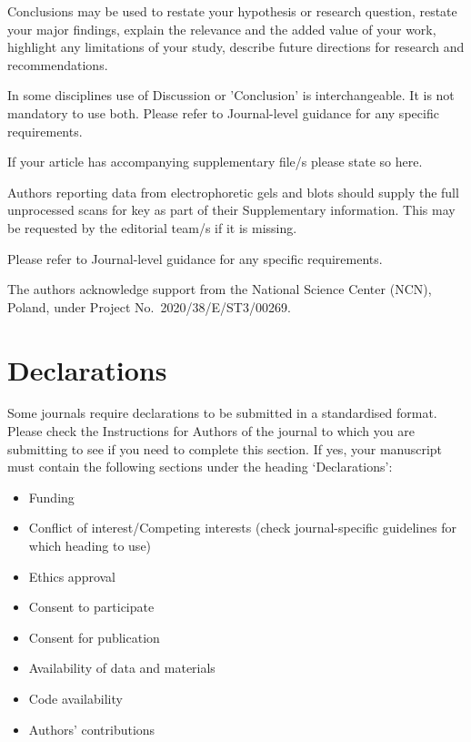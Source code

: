 \documentclass[default,iicol]{sn-jnl}%
\theoremstyle{thmstyleone}%
\theoremstyle{thmstyletwo}%
\theoremstyle{thmstylethree}%
\begin{document}
Conclusions may be used to restate your hypothesis or research question, restate your major findings, explain the relevance and the added value of your work, highlight any limitations of your study, describe future directions for research and recommendations. 

In some disciplines use of Discussion or 'Conclusion' is interchangeable. It is not mandatory to use both. Please refer to Journal-level guidance for any specific requirements. 

\backmatter


If your article has accompanying supplementary file/s please state so here. 

Authors reporting data from electrophoretic gels and blots should supply the full unprocessed scans for key as part of their Supplementary information. This may be requested by the editorial team/s if it is missing.

Please refer to Journal-level guidance for any specific requirements.

The authors acknowledge support from the National Science Center (NCN), Poland, under Project No.~2020/38/E/ST3/00269.

\section*{Declarations}

Some journals require declarations to be submitted in a standardised format. Please check the Instructions for Authors of the journal to which you are submitting to see if you need to complete this section. If yes, your manuscript must contain the following sections under the heading `Declarations':

\begin{itemize}
\item Funding
\item Conflict of interest/Competing interests (check journal-specific guidelines for which heading to use)
\item Ethics approval 
\item Consent to participate
\item Consent for publication
\item Availability of data and materials
\item Code availability 
\item Authors' contributions
\end{itemize}
\end{document}
